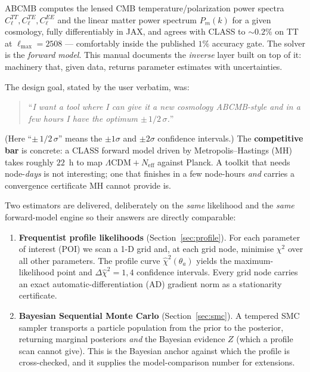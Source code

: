 \documentclass[11pt]{article}
\newcommand{\Neff}{N_{\mathrm{eff}}}
\newcommand{\Cl}{C_\ell}
\newcommand{\chisq}{\chi^2}
\newcommand{\dchisq}{\Delta\hat\chi^2}
\newcommand{\Lmax}{\ell_{\max}}
\begin{document}
\textsc{ABCMB} computes the lensed CMB temperature/polarization power
spectra $\Cl^{TT},\Cl^{TE},\Cl^{EE}$ and the linear matter power spectrum
$P_m(k)$ for a given cosmology, fully differentiably in JAX, and agrees
with CLASS to $\sim0.2\%$ on TT at $\Lmax=2508$ --- comfortably inside the
published $1\%$ accuracy gate. The solver is the \emph{forward
model}. This manual documents the \emph{inverse} layer built on top of
it: machinery that, given data, returns parameter estimates with
uncertainties.

The design goal, stated by the user verbatim, was:
\begin{quote}
``\emph{I want a tool where I can give it a new cosmology
\textsc{ABCMB}-style and in a few hours I have the optimum $\pm\,1/2\,\sigma$.}''
\end{quote}
(Here ``$\pm\,1/2\,\sigma$'' means the $\pm1\sigma$ and $\pm2\sigma$
confidence intervals.) The \textbf{competitive bar} is concrete: a CLASS forward model driven by
Metropolis--Hastings (MH) takes roughly $22$~h to map
$\Lambda\mathrm{CDM}+\Neff$ against Planck. A toolkit that needs
node-\emph{days} is not interesting; one that finishes in a few node-hours
\emph{and} carries a convergence certificate MH cannot provide is.

Two estimators are delivered, deliberately on the \emph{same} likelihood
and the \emph{same} forward-model engine so their answers are directly
comparable:
\begin{enumerate}[leftmargin=2em]
\item \textbf{Frequentist profile likelihoods} (Section~\ref{sec:profile}).
For each parameter of interest (POI) we scan a 1-D grid and, at each grid
node, minimise $\chisq$ over all other parameters. The profile curve
$\hat\chisq(\theta_a)$ yields the maximum-likelihood point and
$\dchisq=1,4$ confidence intervals. Every grid node carries an
exact automatic-differentiation (AD) gradient norm as a stationarity
certificate.
\item \textbf{Bayesian Sequential Monte Carlo} (Section~\ref{sec:smc}).
A tempered SMC sampler transports a particle population from the prior to
the posterior, returning marginal posteriors \emph{and} the Bayesian
evidence $Z$ (which a profile scan cannot give). This is the Bayesian
anchor against which the profile is cross-checked, and it supplies the
model-comparison number for extensions.
\end{enumerate}
\end{document}
